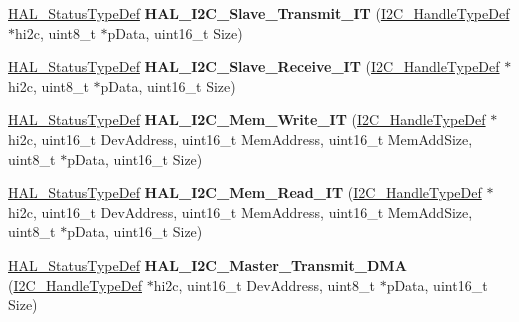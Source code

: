 \begin{DoxyCompactItemize}
\item 
\hypertarget{group___i2_c___exported___functions___group2_gabb5814408402b2e9d07c0b414e64fc9d}{\hyperlink{stm32l1xx__hal__def_8h_a63c0679d1cb8b8c684fbb0632743478f}{H\-A\-L\-\_\-\-Status\-Type\-Def} {\bfseries H\-A\-L\-\_\-\-I2\-C\-\_\-\-Slave\-\_\-\-Transmit\-\_\-\-I\-T} (\hyperlink{struct_i2_c___handle_type_def}{I2\-C\-\_\-\-Handle\-Type\-Def} $\ast$hi2c, uint8\-\_\-t $\ast$p\-Data, uint16\-\_\-t Size)}\label{group___i2_c___exported___functions___group2_gabb5814408402b2e9d07c0b414e64fc9d}

\item 
\hypertarget{group___i2_c___exported___functions___group2_ga48113a4abed4b32ac19da51babb530eb}{\hyperlink{stm32l1xx__hal__def_8h_a63c0679d1cb8b8c684fbb0632743478f}{H\-A\-L\-\_\-\-Status\-Type\-Def} {\bfseries H\-A\-L\-\_\-\-I2\-C\-\_\-\-Slave\-\_\-\-Receive\-\_\-\-I\-T} (\hyperlink{struct_i2_c___handle_type_def}{I2\-C\-\_\-\-Handle\-Type\-Def} $\ast$hi2c, uint8\-\_\-t $\ast$p\-Data, uint16\-\_\-t Size)}\label{group___i2_c___exported___functions___group2_ga48113a4abed4b32ac19da51babb530eb}

\item 
\hypertarget{group___i2_c___exported___functions___group2_gab57ffc32b01392d8bcce3c7ec32b3120}{\hyperlink{stm32l1xx__hal__def_8h_a63c0679d1cb8b8c684fbb0632743478f}{H\-A\-L\-\_\-\-Status\-Type\-Def} {\bfseries H\-A\-L\-\_\-\-I2\-C\-\_\-\-Mem\-\_\-\-Write\-\_\-\-I\-T} (\hyperlink{struct_i2_c___handle_type_def}{I2\-C\-\_\-\-Handle\-Type\-Def} $\ast$hi2c, uint16\-\_\-t Dev\-Address, uint16\-\_\-t Mem\-Address, uint16\-\_\-t Mem\-Add\-Size, uint8\-\_\-t $\ast$p\-Data, uint16\-\_\-t Size)}\label{group___i2_c___exported___functions___group2_gab57ffc32b01392d8bcce3c7ec32b3120}

\item 
\hypertarget{group___i2_c___exported___functions___group2_ga2274a9d894a1dc783bc647f937200f65}{\hyperlink{stm32l1xx__hal__def_8h_a63c0679d1cb8b8c684fbb0632743478f}{H\-A\-L\-\_\-\-Status\-Type\-Def} {\bfseries H\-A\-L\-\_\-\-I2\-C\-\_\-\-Mem\-\_\-\-Read\-\_\-\-I\-T} (\hyperlink{struct_i2_c___handle_type_def}{I2\-C\-\_\-\-Handle\-Type\-Def} $\ast$hi2c, uint16\-\_\-t Dev\-Address, uint16\-\_\-t Mem\-Address, uint16\-\_\-t Mem\-Add\-Size, uint8\-\_\-t $\ast$p\-Data, uint16\-\_\-t Size)}\label{group___i2_c___exported___functions___group2_ga2274a9d894a1dc783bc647f937200f65}

\item 
\hypertarget{group___i2_c___exported___functions___group2_ga978126d41a3a67384f4cb2fe3e6e7e8f}{\hyperlink{stm32l1xx__hal__def_8h_a63c0679d1cb8b8c684fbb0632743478f}{H\-A\-L\-\_\-\-Status\-Type\-Def} {\bfseries H\-A\-L\-\_\-\-I2\-C\-\_\-\-Master\-\_\-\-Transmit\-\_\-\-D\-M\-A} (\hyperlink{struct_i2_c___handle_type_def}{I2\-C\-\_\-\-Handle\-Type\-Def} $\ast$hi2c, uint16\-\_\-t Dev\-Address, uint8\-\_\-t $\ast$p\-Data, uint16\-\_\-t Size)}\label{group___i2_c___exported___functions___group2_ga978126d41a3a67384f4cb2fe3e6e7e8f}


\end{DoxyCompactItemize}
